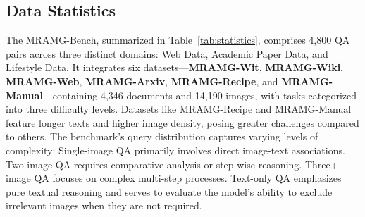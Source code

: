 \subsection{Data Statistics}
\label{sec:statistics}

The MRAMG-Bench, summarized in Table~\ref{tab:statistics}, comprises 4,800 QA pairs across three distinct domains: Web Data, Academic Paper Data, and Lifestyle Data. 
It integrates six datasets—\textbf{MRAMG-Wit}, \textbf{MRAMG-Wiki}, \textbf{MRAMG-Web}, \textbf{MRAMG-Arxiv}, \textbf{MRAMG-Recipe}, and \textbf{MRAMG-Manual}—containing 4,346 documents and 14,190 images, with tasks categorized into three difficulty levels. 
Datasets like MRAMG-Recipe and MRAMG-Manual feature longer texts and higher image density, posing greater challenges compared to others.
The benchmark's query distribution captures varying levels of complexity:
Single-image QA primarily involves direct image-text associations.
Two-image QA requires comparative analysis or step-wise reasoning.
Three+ image QA focuses on complex multi-step processes.
Text-only QA emphasizes pure textual reasoning and serves to evaluate the model's ability to exclude irrelevant images when they are not required.



